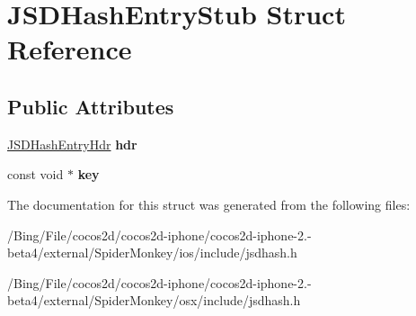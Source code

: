 \hypertarget{struct_j_s_d_hash_entry_stub}{\section{J\-S\-D\-Hash\-Entry\-Stub Struct Reference}
\label{struct_j_s_d_hash_entry_stub}
}
\subsection*{Public Attributes}
\begin{DoxyCompactItemize}
\item 
\hypertarget{struct_j_s_d_hash_entry_stub_a12cd7af35196e82fb7167dd38628cf4c}{\hyperlink{struct_j_s_d_hash_entry_hdr}{J\-S\-D\-Hash\-Entry\-Hdr} {\bfseries hdr}}\label{struct_j_s_d_hash_entry_stub_a12cd7af35196e82fb7167dd38628cf4c}

\item 
\hypertarget{struct_j_s_d_hash_entry_stub_a1cf3ae1d634a3aa1adba9b462933fec0}{const void $\ast$ {\bfseries key}}\label{struct_j_s_d_hash_entry_stub_a1cf3ae1d634a3aa1adba9b462933fec0}

\end{DoxyCompactItemize}


The documentation for this struct was generated from the following files\-:\begin{DoxyCompactItemize}
\item 
/\-Bing/\-File/cocos2d/cocos2d-\/iphone/cocos2d-\/iphone-\/2.-\/beta4/external/\-Spider\-Monkey/ios/include/jsdhash.\-h\item 
/\-Bing/\-File/cocos2d/cocos2d-\/iphone/cocos2d-\/iphone-\/2.-\/beta4/external/\-Spider\-Monkey/osx/include/jsdhash.\-h\end{DoxyCompactItemize}
